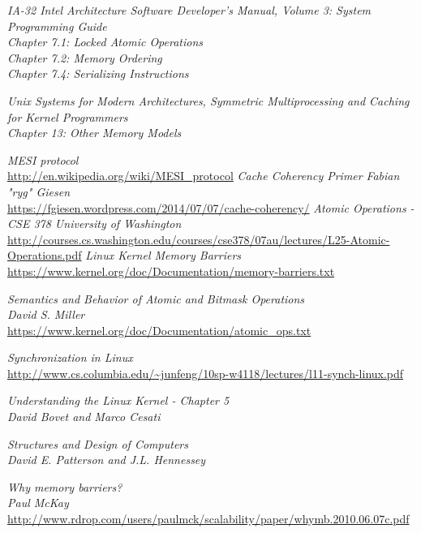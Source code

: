 \documentclass{article}
\begin{document}
\begin{thebibliography}{9}

  \textit{IA-32 Intel Architecture Software Developer's Manual, Volume 3:
    System Programming Guide} \\
  \textit{Chapter 7.1: Locked Atomic Operations} \\
  \textit{Chapter 7.2: Memory Ordering}  \\
  \textit{Chapter 7.4: Serializing Instructions}

  \textit{Unix Systems for Modern Architectures, Symmetric Multiprocessing and Caching
    for Kernel Programmers} \\
  \textit{Chapter 13: Other Memory Models}  
  
  \textit{MESI protocol}  \\
  \url{http://en.wikipedia.org/wiki/MESI_protocol}
  \textit{Cache Coherency Primer}  \textit{Fabian "ryg" Giesen} \\
  \url{https://fgiesen.wordpress.com/2014/07/07/cache-coherency/}
   \textit{Atomic Operations - CSE 378 University of Washington} \\
  \url{http://courses.cs.washington.edu/courses/cse378/07au/lectures/L25-Atomic-Operations.pdf}
  \textit{Linux Kernel Memory Barriers} \\
  \url{https://www.kernel.org/doc/Documentation/memory-barriers.txt}

  \textit{Semantics and Behavior of Atomic and Bitmask Operations} \\
  \textit{David S. Miller} \\
  \url{https://www.kernel.org/doc/Documentation/atomic_ops.txt}

  \textit{Synchronization in Linux} \\
  \url{http://www.cs.columbia.edu/~junfeng/10sp-w4118/lectures/l11-synch-linux.pdf}

  \textit{Understanding the Linux Kernel - Chapter 5} \\
  \textit{David Bovet and Marco Cesati}  

  \textit{Structures and Design of Computers } \\
  \textit{David E. Patterson and J.L. Hennessey} 
  
  \textit{Why memory barriers?} \\
  \textit{Paul McKay} \\
  \url{http://www.rdrop.com/users/paulmck/scalability/paper/whymb.2010.06.07c.pdf}
\end{thebibliography}
\end{document}
